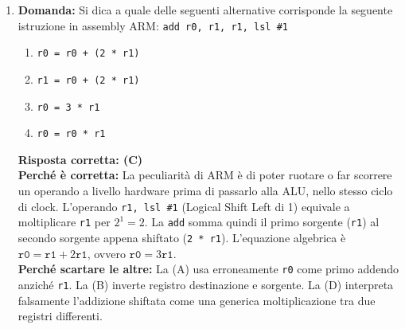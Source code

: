 \documentclass[12pt, a4paper]{article}
\begin{document}
\begin{enumerate}
    \item \textbf{Domanda:} Si dica a quale delle seguenti alternative corrisponde la seguente istruzione in assembly ARM: \texttt{add r0, r1, r1, lsl \#1}
    \begin{enumerate}[label=(\Alph*)]
        \item \texttt{r0 = r0 + (2 * r1)}
        \item \texttt{r1 = r0 + (2 * r1)}
        \item \texttt{r0 = 3 * r1}
        \item \texttt{r0 = r0 * r1}
    \end{enumerate}
    \textbf{Risposta corretta: (C)} \\
    \textbf{Perché è corretta:} La peculiarità di ARM è di poter ruotare o far scorrere un operando a livello hardware prima di passarlo alla ALU, nello stesso ciclo di clock. L'operando \texttt{r1, lsl \#1} (Logical Shift Left di 1) equivale a moltiplicare \texttt{r1} per $2^1 = 2$. La \texttt{add} somma quindi il primo sorgente (\texttt{r1}) al secondo sorgente appena shiftato (\texttt{2 * r1}). L'equazione algebrica è $\texttt{r0} = \texttt{r1} + 2\texttt{r1}$, ovvero $\texttt{r0} = 3\texttt{r1}$. \\
    \textbf{Perché scartare le altre:} La (A) usa erroneamente \texttt{r0} come primo addendo anziché \texttt{r1}. La (B) inverte registro destinazione e sorgente. La (D) interpreta falsamente l'addizione shiftata come una generica moltiplicazione tra due registri differenti.


\end{enumerate}
\end{document}
